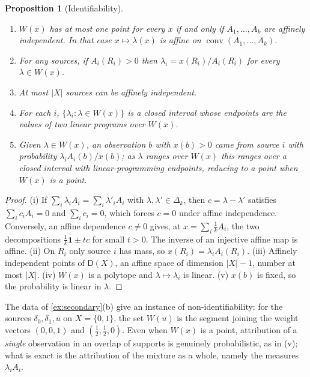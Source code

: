 \documentclass[11pt]{article}
\newtheorem{proposition}[theorem]{Proposition}
\theoremstyle{definition}
\theoremstyle{remark}
\newcommand{\D}{\mathsf{D}}
\begin{document}
\begin{proposition}[Identifiability]\label{prop:ident}
\leavevmode
\begin{enumerate}[label=(\roman*)]
\item $W(x)$ has at most one point for every $x$ if and only if $A_1,\dots,A_k$ are affinely
  independent. In that case $x\mapsto\lambda(x)$ is affine on $\operatorname{conv}(A_1,\dots,A_k)$.
\item For any sources, if $A_i(R_i)>0$ then $\lambda_i=x(R_i)/A_i(R_i)$ for every $\lambda\in W(x)$.
\item At most $|X|$ sources can be affinely independent.
\item For each $i$, $\{\lambda_i:\lambda\in W(x)\}$ is a closed interval whose endpoints are the values
  of two linear programs over $W(x)$.
\item Given $\lambda\in W(x)$, an observation $b$ with $x(b)>0$ came from source $i$ with probability
  $\lambda_iA_i(b)/x(b)$; as $\lambda$ ranges over $W(x)$ this ranges over a closed interval with
  linear-programming endpoints, reducing to a point when $W(x)$ is a point.
\end{enumerate}
\end{proposition}
\begin{proof}
(i) If $\sum_i\lambda_iA_i=\sum_i\lambda'_iA_i$ with $\lambda,\lambda'\in\Delta_k$, then $c=\lambda-\lambda'$
satisfies $\sum_ic_iA_i=0$ and $\sum_ic_i=0$, which forces $c=0$ under affine independence.
Conversely, an affine dependence $c\ne0$ gives, at $x=\sum_i\tfrac1kA_i$, the two decompositions
$\tfrac1k\mathbf{1}\pm tc$ for small $t>0$. The inverse of an injective affine map is affine.
(ii) On $R_i$ only source $i$ has mass, so $x(R_i)=\lambda_iA_i(R_i)$. (iii) Affinely independent points
of $\D(X)$, an affine space of dimension $|X|-1$, number at most $|X|$. (iv) $W(x)$ is a polytope and
$\lambda\mapsto\lambda_i$ is linear. (v) $x(b)$ is fixed, so the probability is linear in $\lambda$.
\end{proof}

The data of \cref{ex:secondary}(b) give an instance of non-identifiability: for the sources
$\delta_0,\delta_1,u$ on $X=\{0,1\}$, the set $W(u)$ is the segment joining the weight vectors $(0,0,1)$
and $(\tfrac12,\tfrac12,0)$. Even when $W(x)$ is a
point, attribution of a \emph{single} observation in an overlap of supports is genuinely
probabilistic, as in (v); what is exact is the attribution of the mixture as a whole, namely the
measures $\lambda_iA_i$.
\end{document}
